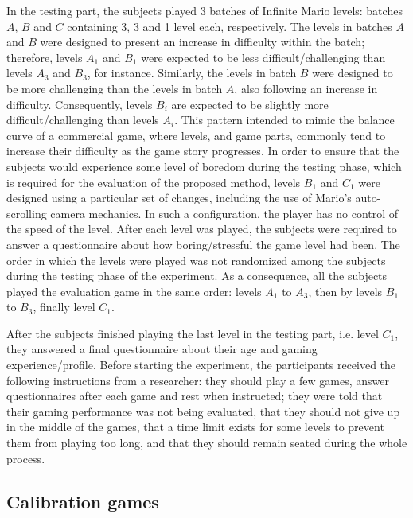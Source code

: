 In the testing part, the subjects played 3 batches of Infinite Mario levels: batches $A$, $B$ and $C$ containing 3, 3 and 1 level each, respectively. The levels in batches $A$ and $B$ were designed to present an increase in difficulty within the batch; therefore, levels $A_1$ and $B_1$ were expected to be less difficult/challenging than levels $A_3$ and $B_3$, for instance. Similarly, the levels in batch $B$ were designed to be more challenging than the levels in batch $A$, also following an increase in difficulty. Consequently, levels $B_i$ are expected to be slightly more difficult/challenging than levels $A_i$. This pattern intended to mimic the balance curve of a commercial game, where levels, and game parts, commonly tend to increase their difficulty as the game story progresses. In order to ensure that the subjects would experience some level of boredom during the testing phase, which is required for the evaluation of the proposed method, levels $B_1$ and $C_1$ were designed using a particular set of changes, including the use of Mario's auto-scrolling camera mechanics. In such a configuration, the player has no control of the speed of the level. After each level was played, the subjects were required to answer a questionnaire about how boring/stressful the game level had been. The order in which the levels were played was not randomized among the subjects during the testing phase of the experiment. As a consequence, all the subjects played the evaluation game in the same order: levels $A_1$ to $A_3$, then by levels $B_1$ to $B_3$, finally level $C_1$.


After the subjects finished playing the last level in the testing part, i.e. level $C_1$, they answered a final questionnaire about their age and gaming experience/profile. Before starting the experiment, the participants received the following instructions from a researcher: they should play a few games, answer questionnaires after each game and rest when instructed; they were told that their gaming performance was not being evaluated, that they should not give up in the middle of the games, that a time limit exists for some levels to prevent them from playing too long, and that they should remain seated during the whole process.

\subsection{Calibration games}
\label{sec:experiment2-calibration-games}

